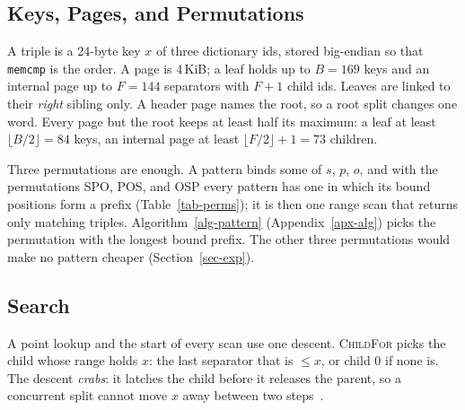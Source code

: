 \subsection{Keys, Pages, and Permutations}

A triple is a 24-byte key $x$ of three dictionary ids, stored big-endian so that
\texttt{memcmp} is the order.
A page is 4\,KiB; a leaf holds up to $B{=}169$ keys and an internal page up
to $F{=}144$ separators with $F{+}1$ child ids.
Leaves are linked to their \emph{right} sibling only.
A header page names the root, so a root split changes one word.
Every page but the root keeps at least half its maximum: a leaf at least
$\lfloor B/2\rfloor=84$ keys, an internal page at least
$\lfloor F/2\rfloor{+}1=73$ children.

Three permutations are enough.
A pattern binds some of $s$, $p$, $o$, and with the permutations SPO, POS,
and OSP every pattern has one in which its bound positions form a prefix
(Table~\ref{tab-perms}); it is then one range scan that returns only
matching triples.
Algorithm~\ref{alg-pattern} (Appendix~\ref{apx-alg}) picks the permutation with the longest bound
prefix.
The other three permutations would make no pattern cheaper
(Section~\ref{sec-exp}).

\begin{table}[t]
\caption{The permutation $\pi$ that answers each pattern, and the length $\ell(\pi)$ of the bound prefix.}
\label{tab-perms}
\small
{}
\end{table}


\subsection{Search}

A point lookup and the start of every scan use one descent.
\textsc{ChildFor} picks the child whose range holds $x$: the last separator
that is $\le x$, or child 0 if none is.
The descent \emph{crabs}: it latches the child before it releases the parent,
so a concurrent split cannot move $x$ away between two
steps~\cite{lehman1981,graefe2011}.

